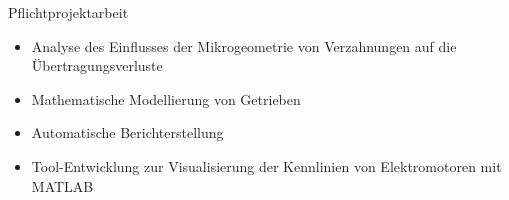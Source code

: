 Pflichtprojektarbeit
\begin{itemize}
	\item Analyse des Einflusses der Mikrogeometrie von Verzahnungen auf die Übertragungsverluste
	\item Mathematische Modellierung von Getrieben
	\item Automatische Berichterstellung
	\item Tool-Entwicklung zur Visualisierung der Kennlinien von Elektromotoren mit MATLAB
\end{itemize}
\SmallSep